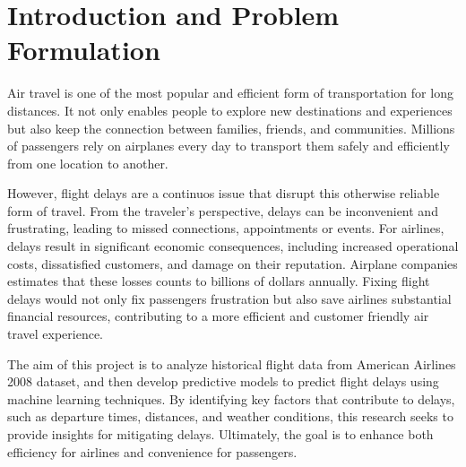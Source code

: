 \section{Introduction and Problem Formulation}
Air travel is one of the most popular and efficient form of transportation for long distances. 
It not only enables people to explore new destinations and experiences but also keep the connection between families, friends, and communities.
Millions of passengers rely on airplanes every day to transport them safely and efficiently from one location to another.
\par
However, flight delays are a continuos issue that disrupt this otherwise reliable form of travel. 
From the traveler’s perspective, delays can be inconvenient and frustrating, leading to missed connections, appointments or events. 
For airlines, delays result in significant economic consequences, including increased operational costs, dissatisfied customers, and damage on their reputation.
Airplane companies estimates that these losses counts to billions of dollars annually. 
Fixing flight delays would not only fix passengers frustration but also save airlines substantial financial resources, contributing to a more efficient and customer friendly air travel experience.
\par
The aim of this project is to analyze historical flight data from American Airlines 2008 dataset, and then develop predictive models to predict flight delays using machine learning techniques.
By identifying key factors that contribute to delays, such as departure times, distances, and weather conditions, this research seeks to provide insights for mitigating delays. 
Ultimately, the goal is to enhance both efficiency for airlines and convenience for passengers.
